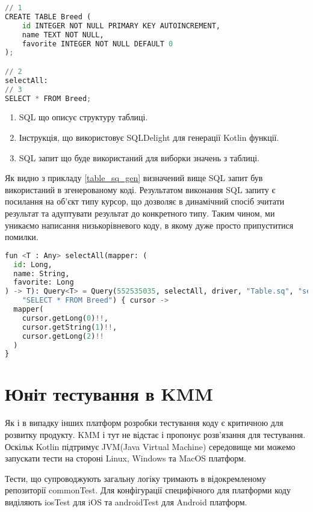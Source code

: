 \begin{lstlisting}[style=light, language=Python,label={lst:table_sq},caption=Table.sq]
// 1
CREATE TABLE Breed (
    id INTEGER NOT NULL PRIMARY KEY AUTOINCREMENT,
    name TEXT NOT NULL,
    favorite INTEGER NOT NULL DEFAULT 0
);

// 2
selectAll:
// 3
SELECT * FROM Breed;
\end{lstlisting}

\begin{enumerate}
    \item SQL що описує структуру таблиці.
    \item Інструкція, що використовує SQLDelight для генерації Kotlin функції.
    \item SQL запит що буде використаний для виборки значень з таблиці.
\end{enumerate}

Як видно з прикладу \ref{table_sq_gen} визначений вище SQL запит був використаний в згенерованому коді.
Результатом виконання SQL запиту є посилання на об'єкт типу курсор, що дозволяє в динамічний спосіб зчитати
результат та адуптувати результат до конкретного типу.
Таким чином, ми уникаємо написання низькорівневого коду, в якому дуже просто припуститися помилки.

\begin{lstlisting}[style=light, language=Python,label={lst:table_sq_gen},caption=Generate code]
fun <T : Any> selectAll(mapper: (
  id: Long,
  name: String,
  favorite: Long
) -> T): Query<T> = Query(552535035, selectAll, driver, "Table.sq", "selectAll",
    "SELECT * FROM Breed") { cursor ->
  mapper(
    cursor.getLong(0)!!,
    cursor.getString(1)!!,
    cursor.getLong(2)!!
  )
}
\end{lstlisting}


\section{Юніт тестування в KMM}
\label{sec:kmm_unit_testing}

Як і в випадку інших платформ розробки тестування коду є критичною для розвитку продукту.
KMM і тут не відстає і пропонує розв'язання для тестування.
Оскільк Kotlin підтримує JVM(Java Virtual Machine) середовище ми можемо запускати тести на стороні Linux, Windows та MacOS платформ.

Тести, що супроводжують загальну логіку тримають в відокремленому репозиторії commonTest.
Для конфігурації специфічного для платформи коду виділяють iosTest для iOS та androidTest для Android платформ.


